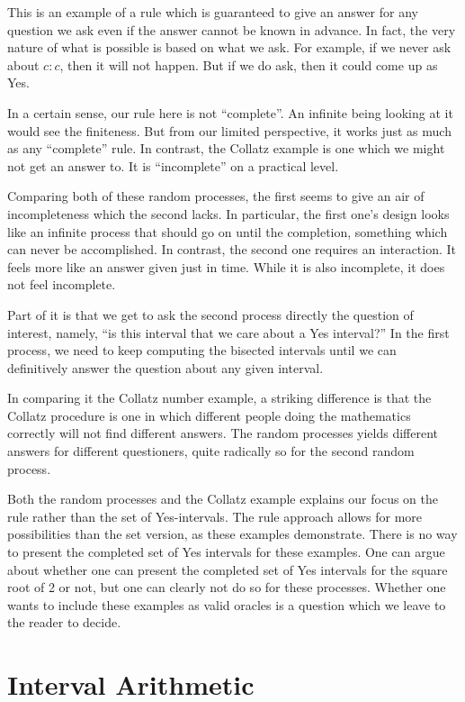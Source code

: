 \documentclass[12pt]{article}
\begin{document}
This is an example of a rule which is guaranteed to give an answer for any question we ask even if the answer cannot be known in advance. In fact, the very nature of what is possible is based on what we ask. For example, if we never ask about  $c:c$, then it will not happen. But if we do ask, then it could come up as Yes. 

In a certain sense, our rule here is not ``complete''. An infinite being looking at it would see the finiteness. But from our limited perspective, it works just as much as any ``complete'' rule. In contrast, the Collatz example is one which we might not get an answer to. It is ``incomplete'' on a practical level. 

Comparing both of these random processes, the first seems to give an air of incompleteness which the second lacks. In particular, the first one's design looks like an infinite process that should go on until the completion, something which can never be accomplished. In contrast, the second one requires an interaction. It feels more like an answer given just in time. While it is also incomplete, it does not feel incomplete. 
 
Part of it is that we get to ask the second process directly the question of interest, namely, ``is this interval that we care about a Yes interval?'' In the first process, we need to keep computing the bisected intervals until we can definitively answer the question about any given interval. 

In comparing it the Collatz number example, a striking difference is that the Collatz procedure is one in which different people doing the mathematics correctly will not find different answers. The random processes yields different answers for different questioners, quite radically so for the second random process. 

Both the random processes and the Collatz example explains our focus on the rule rather than the set of Yes-intervals. The rule approach allows for more possibilities than the set version, as these examples demonstrate. There is no way to present the completed set of Yes intervals for these examples. One can argue about whether one can present the completed set of Yes intervals for the square root of 2 or not, but one can clearly not do so for these processes. Whether one wants to include these examples as valid oracles is a question which we leave to the reader to decide. 

\section{Interval Arithmetic}
\end{document}
